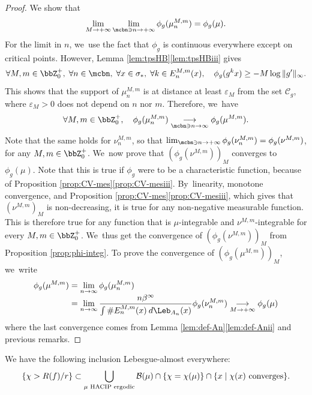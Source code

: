 \begin{proof}
We show that
\[
\lim_{M \to +\infty} \lim_{\mcbn \ni n \to +\infty} \phi_g(\mu_n^{M,m}) = \phi_g(\mu).
\]
For the limit in $n$, we~use the fact that $\phi_g$ is continuous everywhere except on critical points.
However, Lemma \ref{lem:tpsHB}\eqref{lem:tpsHBiii} gives
\[
\forall M,m \in \bbZ_0^+,\; \forall n \in \mcbn,\; \forall x \in \sigma_*,\; \forall k \in E_n^{M,m}(x),\quad \phi_g(g^k x) \geq -M \log \| g' \|_{\infty}.
\]
This shows that the support of $\mu_n^{M,m}$ is at distance at least $\varepsilon_M$ from the set $\mathcal{C}_g$, where $\varepsilon_M>0$ does not depend on $n$ nor $m$.
Therefore, we~have
\[
\forall M,m \in \bbZ_0^+,\quad \phi_g(\mu_n^{M,m}) \underset{\mcbn \ni n \to \infty}{\longrightarrow}
\phi_g(\mu^{M,m}).
\]
Note that the same holds for $\nu_n^{M,m}$, so that $\lim_{\mcbn \ni n \to +\infty}\phi_g(\nu_n^{M,m}) = \phi_g(\nu^{M,m})$, for any $M,m \in \bbZ_0^+$. We~now prove that $\left (\phi_g(\nu^{M,m}) \right)_M$ converges to $\phi_g(\mu)$.
Note that this is true if $\phi_g$ were to be a characteristic function, because of Proposition \ref{prop:CV-mes}\eqref{prop:CV-mesiii}. By~linearity, monotone convergence, and Proposition \ref{prop:CV-mes}\eqref{prop:CV-mesiii}, which gives that $\left (\nu^{M,m} \right)_M$ is non-decreasing, it is true for any non-negative measurable function.
This is therefore true for any function that is $\mu$-integrable and $\nu^{M,m}$-integrable for every $M,m \in \bbZ_0^+$. We~thus get the convergence of $\left (\phi_g(\nu^{M,m})\right)_M$ from Proposition \ref{prop:phi-integ}. To prove the convergence of $\left (\phi_g(\mu^{M,m})\right)_M$, we~write
\begin{align*}
\phi_g(\mu^{M,m}) &= \lim_{n \to \infty} \phi_g(\mu_n^{M,m})\\[-3pt]
&= \lim_{n \to \infty} \frac{n \beta^{\infty}}{\int \# E_n^{M,m}(x) \: d \Leb_{A_n}(x)} \phi_g(\nu_n^{M,m})
\underset{M \to +\infty}{\longrightarrow} \phi_g(\mu)
\end{align*}
where the last convergence comes from Lemma \ref{lem:def-An}\eqref{lem:def-Anii} and previous remarks.
\end{proof}

\label{ssec:bassins}

\begin{prop}
\label{prop:rec-bassins}
We have the following inclusion Lebesgue-almost everywhere:
\[
\left \{ \chi > R(f)/r \right \} \subset \bigcup_{\mu \textup{ HACIP ergodic}} \mathcal{B}(\mu) \cap \{ \chi = \chi(\mu) \} \cap \{ x \mid \chi(x) \textup{ converges} \}.
\]
\end{prop}

